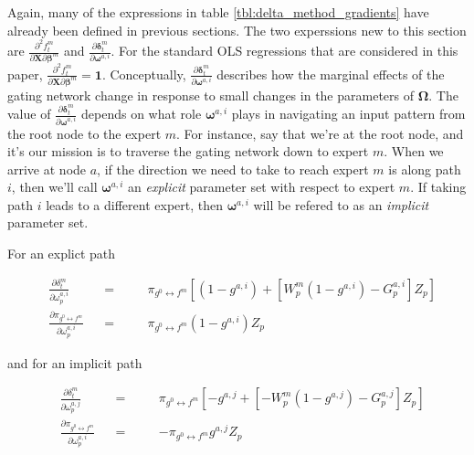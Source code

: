 \documentclass[12pt]{article}
\newcommand{\gateprod}[2]{\pi_{#1 \longleftrightarrow #2}}
\begin{document}
Again, many of the expressions in table \ref{tbl:delta_method_gradients}
have already been defined in previous sections. The two experssions new to this
section are $\frac{\partial^{2} f^{m}_{t}}{\partial \boldsymbol{X} \partial \boldsymbol{\beta}^{m}}$
and  $\frac{\partial \boldsymbol{\delta}^{m}_{t}}{\partial \boldsymbol{\omega}^{a,i}}$.
For the standard OLS regressions that are considered in this paper,
$\frac{\partial^{2} f^{m}_{t}}{\partial \boldsymbol{X} \partial \boldsymbol{\beta}^{m}} = \boldsymbol{1}$.
Conceptually, $\frac{\partial \boldsymbol{\delta}^{m}_{t}}{\partial \boldsymbol{\omega}^{a,i}}$
describes how the marginal effects of the gating network change in response
to small changes in the parameters of $\boldsymbol{\Omega}$. The value of
$\frac{\partial \boldsymbol{\delta}^{m}_{t}}{\partial \boldsymbol{\omega}^{a,i}}$
depends on what role $\boldsymbol{\omega}^{a,i}$ plays in navigating an input
pattern from the root node to the expert $m$. For instance, say that we're
at the root node, and it's our mission is to traverse the gating network down
to expert $m$. When we arrive at node $a$, if the direction we need to take to
reach expert $m$ is along path $i$, then we'll call $\boldsymbol{\omega}^{a,i}$
an \textit{explicit} parameter set with respect to expert $m$. If taking path $i$ leads to a different expert,
then $\boldsymbol{\omega}^{a,i}$ will be refered to as an \textit{implicit}
parameter set.

For an explict path

\begin{subequations} \label{eq:delta_definitions_exp}
  \begin{alignat}{3}
  &\frac{\partial \delta^{m}_{t}}{\partial \omega^{a,i}_{p}}            &&=&\quad& \gateprod{g^{0}}{f^{m}} \left[ (1 - g^{a,i})  +  \left[ W^{m}_{p}  (1 - g^{a,i}) - G^{a,i}_{p}  \right] Z_{p} \right] \label{eq:delta_gate_partial_exp}  \\
  &\frac{\partial \gateprod{g^{0}}{f^{m}}}{\partial \omega^{a,i}_{p}}   &&=&\quad& \gateprod{g^{0}}{f^{m}} (1 - g^{a,i}) Z_{p}
  \end{alignat}
  \end{subequations}

and for an implicit path

\begin{subequations} \label{eq:delta_definitions_imp}
\begin{alignat}{3}
&\frac{\partial \delta^{m}_{t}}{\partial \omega^{a,j}_{p}}            &&=&\quad& \gateprod{g^{0}}{f^{m}} \left[ - g^{a,j}  +  \left[ - W^{m}_{p}  (1 - g^{a,j}) - G^{a,j}_{p}  \right] Z_{p} \right] \label{eq:delta_gate_partial_imp}  \\
&\frac{\partial \gateprod{g^{0}}{f^{m}}}{\partial \omega^{a,i}_{p}}   &&=&\quad& - \gateprod{g^{0}}{f^{m}} g^{a,j} Z_{p}
\end{alignat}
\end{subequations}
\end{document}

